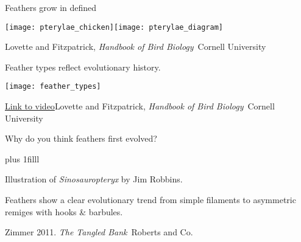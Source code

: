 \documentclass[t]{beamer}
\begin{document}
\begin{frame}[t,plain]{Feathers grow in defined }

\vspace{-0.75\baselineskip}

\texttt{[image: pterylae\_chicken]}\hfill \texttt{[image: pterylae\_diagram]}

	\vfilll

	\tiny \hfill Lovette and Fitzpatrick, \textit{Handbook of Bird Biology} \textcopyright\,Cornell University

\end{frame}
%
\begin{frame}[t,plain]{Feather types reflect evolutionary history.}


\texttt{[image: feather\_types]}\\

	\vfilll


	\tiny \href{https://www.youtube.com/watch?v=MdNyeasi0GI}{Link to video}\hfill Lovette and Fitzpatrick, \textit{Handbook of Bird Biology} \textcopyright\,Cornell University

\end{frame}

{
\begin{frame}[t,plain]

	\vspace{8em}
	
	\hspace{12em}\hangpara Why do you think feathers first evolved?

	
	\vskip0pt plus 1filll
	
	\tiny\hfill Illustration of \textit{Sinosauropteryx} by Jim Robbins.
\end{frame}
}

{
\begin{frame}[b,plain]{Feathers show a clear evolutionary trend from simple filaments to asymmetric remiges with hooks {\normalsize \&} barbules.}

\vfilll

\tiny \hfill Zimmer 2011. \textit{The Tangled Bank} \textcopyright\,Roberts and Co.

\end{frame}
}
\end{document}
